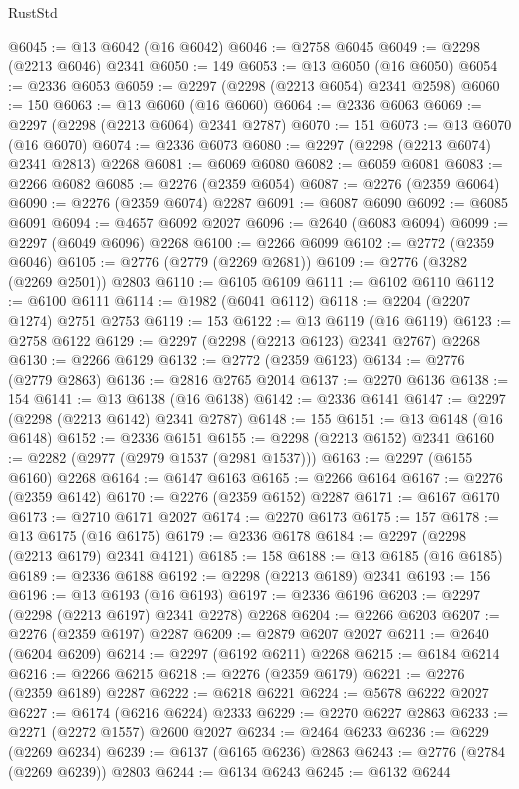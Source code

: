 \begin{lexlean}{RustStd}
\begin{coremodule}
@6045 := @13 @6042 (@16 @6042)
@6046 := @2758 @6045
@6049 := @2298 (@2213 @6046) @2341
@6050 := 149
@6053 := @13 @6050 (@16 @6050)
@6054 := @2336 @6053
@6059 := @2297 (@2298 (@2213 @6054) @2341 @2598)
@6060 := 150
@6063 := @13 @6060 (@16 @6060)
@6064 := @2336 @6063
@6069 := @2297 (@2298 (@2213 @6064) @2341 @2787)
@6070 := 151
@6073 := @13 @6070 (@16 @6070)
@6074 := @2336 @6073
@6080 := @2297 (@2298 (@2213 @6074) @2341 @2813) @2268
@6081 := @6069 @6080
@6082 := @6059 @6081
@6083 := @2266 @6082
@6085 := @2276 (@2359 @6054)
@6087 := @2276 (@2359 @6064)
@6090 := @2276 (@2359 @6074) @2287
@6091 := @6087 @6090
@6092 := @6085 @6091
@6094 := @4657 @6092 @2027
@6096 := @2640 (@6083 @6094)
@6099 := @2297 (@6049 @6096) @2268
@6100 := @2266 @6099
@6102 := @2772 (@2359 @6046)
@6105 := @2776 (@2779 (@2269 @2681))
@6109 := @2776 (@3282 (@2269 @2501)) @2803
@6110 := @6105 @6109
@6111 := @6102 @6110
@6112 := @6100 @6111
@6114 := @1982 (@6041 @6112)
@6118 := @2204 (@2207 @1274) @2751 @2753
@6119 := 153
@6122 := @13 @6119 (@16 @6119)
@6123 := @2758 @6122
@6129 := @2297 (@2298 (@2213 @6123) @2341 @2767) @2268
@6130 := @2266 @6129
@6132 := @2772 (@2359 @6123)
@6134 := @2776 (@2779 @2863)
@6136 := @2816 @2765 @2014
@6137 := @2270 @6136
@6138 := 154
@6141 := @13 @6138 (@16 @6138)
@6142 := @2336 @6141
@6147 := @2297 (@2298 (@2213 @6142) @2341 @2787)
@6148 := 155
@6151 := @13 @6148 (@16 @6148)
@6152 := @2336 @6151
@6155 := @2298 (@2213 @6152) @2341
@6160 := @2282 (@2977 (@2979 @1537 (@2981 @1537)))
@6163 := @2297 (@6155 @6160) @2268
@6164 := @6147 @6163
@6165 := @2266 @6164
@6167 := @2276 (@2359 @6142)
@6170 := @2276 (@2359 @6152) @2287
@6171 := @6167 @6170
@6173 := @2710 @6171 @2027
@6174 := @2270 @6173
@6175 := 157
@6178 := @13 @6175 (@16 @6175)
@6179 := @2336 @6178
@6184 := @2297 (@2298 (@2213 @6179) @2341 @4121)
@6185 := 158
@6188 := @13 @6185 (@16 @6185)
@6189 := @2336 @6188
@6192 := @2298 (@2213 @6189) @2341
@6193 := 156
@6196 := @13 @6193 (@16 @6193)
@6197 := @2336 @6196
@6203 := @2297 (@2298 (@2213 @6197) @2341 @2278) @2268
@6204 := @2266 @6203
@6207 := @2276 (@2359 @6197) @2287
@6209 := @2879 @6207 @2027
@6211 := @2640 (@6204 @6209)
@6214 := @2297 (@6192 @6211) @2268
@6215 := @6184 @6214
@6216 := @2266 @6215
@6218 := @2276 (@2359 @6179)
@6221 := @2276 (@2359 @6189) @2287
@6222 := @6218 @6221
@6224 := @5678 @6222 @2027
@6227 := @6174 (@6216 @6224) @2333
@6229 := @2270 @6227 @2863
@6233 := @2271 (@2272 @1557) @2600 @2027
@6234 := @2464 @6233
@6236 := @6229 (@2269 @6234)
@6239 := @6137 (@6165 @6236) @2863
@6243 := @2776 (@2784 (@2269 @6239)) @2803
@6244 := @6134 @6243
@6245 := @6132 @6244

\end{coremodule}
\end{lexlean}
